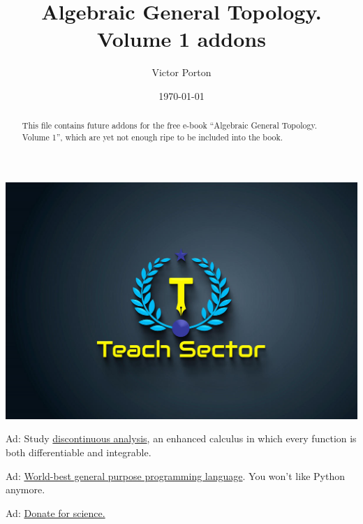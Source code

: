 \documentclass[a4paper,oneside,english,reqno]{amsbook}
\begin{document}
\noindent
\href{https://teachsector.com/limit/}{\includegraphics[scale=0.3]{img/Teach-Sector.jpeg}}

\noindent
Ad: Study \href{https://teachsector.com/limit/}{discontinuous analysis}, an enhanced
calculus in which every function is both differentiable and integrable.

\noindent
Ad: \href{https://teachsector.com/dforpython/}{World-best general purpose programming language}.
You won't like Python anymore.

\noindent
Ad: \href{https://science-dao.vporton.name}{Donate for science.}

\title{Algebraic General Topology. Volume 1 addons}

\author{Victor Porton}





\date{\today}


\begin{abstract}
This file contains future addons for the free e-book ``Algebraic General
Topology. Volume 1'', which are yet not enough ripe to be included into the
book.
\end{abstract}





\maketitle
\end{document}
